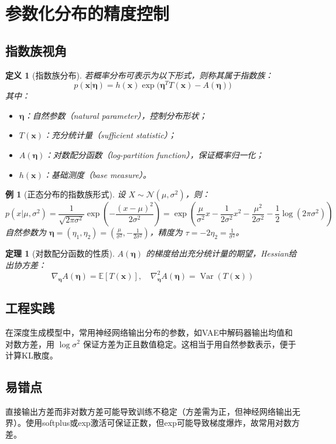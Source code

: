 \documentclass[UTF8, 10pt]{ctexart}
\newtheorem{theorem}{定理}[section]
\newtheorem{definition}{定义}[section]
\newtheorem{example}{例}[section]
\newcommand{\E}{\mathbb{E}}
\newcommand{\Var}{\operatorname{Var}}
\begin{document}
\section{参数化分布的精度控制}
\subsection{指数族视角}
\begin{definition}[指数族分布]
若概率分布可表示为以下形式，则称其属于指数族：
\[
p(\bm{x}|\bm{\eta}) = h(\bm{x})\exp\big(\bm{\eta}^T T(\bm{x}) - A(\bm{\eta})\big)
\]
其中：
\begin{itemize}
    \item $\bm{\eta}$：自然参数（natural parameter），控制分布形状；
    \item $T(\bm{x})$：充分统计量（sufficient statistic）；
    \item $A(\bm{\eta})$：对数配分函数（log-partition function），保证概率归一化；
    \item $h(\bm{x})$：基础测度（base measure）。
\end{itemize}
\end{definition}

\begin{example}[正态分布的指数族形式]
设 $X \sim \mathcal{N}(\mu, \sigma^2)$，则：
\[
p(x|\mu,\sigma^2) = \frac{1}{\sqrt{2\pi\sigma^2}} \exp\left(-\frac{(x-\mu)^2}{2\sigma^2}\right) = \exp\left(\frac{\mu}{\sigma^2} x - \frac{1}{2\sigma^2} x^2 - \frac{\mu^2}{2\sigma^2} - \frac{1}{2}\log(2\pi\sigma^2)\right)
\]
自然参数为 $\bm{\eta} = (\eta_1, \eta_2) = \left(\frac{\mu}{\sigma^2}, -\frac{1}{2\sigma^2}\right)$，精度为 $\tau = -2\eta_2 = \frac{1}{\sigma^2}$。
\end{example}

\begin{theorem}[对数配分函数的性质]
$A(\bm{\eta})$ 的梯度给出充分统计量的期望，Hessian给出协方差：
\[
\nabla_{\bm{\eta}} A(\bm{\eta}) = \E[T(\bm{x})], \quad \nabla^2_{\bm{\eta}} A(\bm{\eta}) = \Var(T(\bm{x}))
\]
\end{theorem}

\subsection{工程实践}
在深度生成模型中，常用神经网络输出分布的参数，如VAE中解码器输出均值和对数方差，用 $\log\sigma^2$ 保证方差为正且数值稳定。这相当于用自然参数表示，便于计算KL散度。

\subsection{易错点}
直接输出方差而非对数方差可能导致训练不稳定（方差需为正，但神经网络输出无界）。使用softplus或exp激活可保证正数，但exp可能导致梯度爆炸，故常用对数方差。
\end{document}
